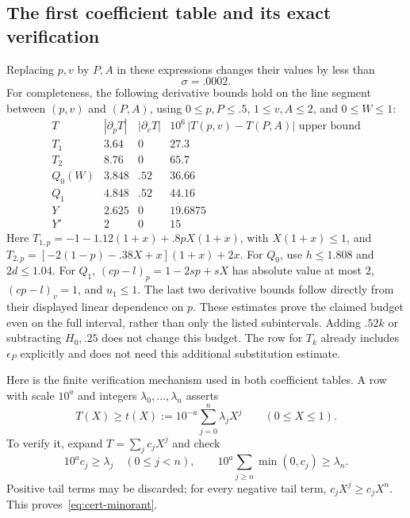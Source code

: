 \subsection{The first coefficient table and its exact verification}

Replacing $p,v$ by $P,A$ in these expressions changes their values
by less than
\begin{equation}
 \sigma=.0002.
 \label{eq:cert-sigma}
\end{equation}
For completeness, the following derivative bounds hold on the line
segment between $(p,v)$ and $(P,A)$, using $0\le p,P\le.5$,
$1\le v,A\le2$, and $0\le W\le1$:
\[
\begin{array}{c|rr|r}
 T&|\partial_pT|&|\partial_vT|&
 10^6\,|T(p,v)-T(P,A)|\text{ upper bound}\\ \hline
 T_1&3.64&0&27.3\\
 T_2&8.76&0&65.7\\
 Q_0(W)&3.848&.52&36.66\\
 Q_1&4.848&.52&44.16\\
 Y&2.625&0&19.6875\\
 Y'&2&0&15
\end{array}
\]
Here $T_{1,p}=-1-1.12(1+x)+.8pX(1+x)$, with
$X(1+x)\le1$, and
$T_{2,p}=[-2(1-p)-.38X+x](1+x)+2x$.
For $Q_0$, use $h\le1.808$ and $2d\le1.04$.
For $Q_1$, $(cp-l)_p=1-2sp+sX$ has absolute value at most $2$,
$(cp-l)_v=1$, and $u_1\le1$.
The last two derivative bounds follow directly from their displayed
linear dependence on $p$.  These estimates prove the claimed budget
even on the full interval, rather than only the listed subintervals.
Adding $.52k$ or subtracting $H_0,.25$ does not change this budget.
The row for $T_k$ already includes $\epsilon_P$ explicitly and does
not need this additional substitution estimate.

Here is the finite verification mechanism used in both coefficient
tables.  A row with scale $10^a$ and integers
$\lambda_0,\ldots,\lambda_n$ asserts
\begin{equation}
 T(X)\ge t(X):=10^{-a}\sum_{j=0}^n\lambda_jX^j
       \qquad(0\le X\le1).
 \label{eq:cert-minorant}
\end{equation}
To verify it, expand $T=\sum_jc_jX^j$ and check
\begin{equation}
 10^ac_j\ge\lambda_j\quad(0\le j<n),\qquad
 10^a\sum_{j\ge n}\min(0,c_j)\ge\lambda_n.
 \label{eq:cert-coefficient-rule}
\end{equation}
Positive tail terms may be discarded; for every negative tail term,
$c_jX^j\ge c_jX^n$.  This proves~\eqref{eq:cert-minorant}.

